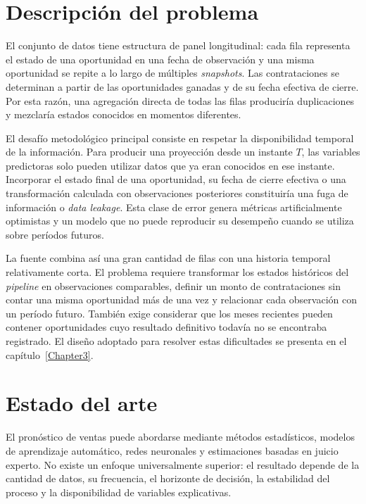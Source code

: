 \section{Descripción del problema}
\label{sec:descripcionProblema}

El conjunto de datos tiene estructura de panel longitudinal: cada fila representa el estado de una oportunidad en una fecha de observación y una misma oportunidad se repite a lo largo de múltiples \textit{snapshots}. Las contrataciones se determinan a partir de las oportunidades ganadas y de su fecha efectiva de cierre. Por esta razón, una agregación directa de todas las filas produciría duplicaciones y mezclaría estados conocidos en momentos diferentes.

El desafío metodológico principal consiste en respetar la disponibilidad temporal de la información. Para producir una proyección desde un instante $T$, las variables predictoras solo pueden utilizar datos que ya eran conocidos en ese instante. Incorporar el estado final de una oportunidad, su fecha de cierre efectiva o una transformación calculada con observaciones posteriores constituiría una fuga de información o \textit{data leakage}. Esta clase de error genera métricas artificialmente optimistas y un modelo que no puede reproducir su desempeño cuando se utiliza sobre períodos futuros.

La fuente combina así una gran cantidad de filas con una historia temporal relativamente corta. El problema requiere transformar los estados históricos del \textit{pipeline} en observaciones comparables, definir un monto de contrataciones sin contar una misma oportunidad más de una vez y relacionar cada observación con un período futuro. También exige considerar que los meses recientes pueden contener oportunidades cuyo resultado definitivo todavía no se encontraba registrado. El diseño adoptado para resolver estas dificultades se presenta en el capítulo~\ref{Chapter3}.

\section{Estado del arte}
\label{sec:estadoArte}

El pronóstico de ventas puede abordarse mediante métodos estadísticos, modelos de aprendizaje automático, redes neuronales y estimaciones basadas en juicio experto. No existe un enfoque universalmente superior: el resultado depende de la cantidad de datos, su frecuencia, el horizonte de decisión, la estabilidad del proceso y la disponibilidad de variables explicativas.

